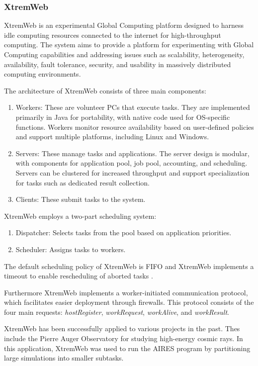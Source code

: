 \subsubsection{XtremWeb}
\label{subsec:background:related_work:xtremweb}
XtremWeb is an experimental Global Computing platform designed to harness idle computing resources connected to the internet for high-throughput computing. The system aims to provide a platform for experimenting with Global Computing capabilities and addressing issues such as scalability, heterogeneity, availability, fault tolerance, security, and usability in massively distributed computing environments. \cite{relatedwork:xtremweb}

The architecture of XtremWeb consists of three main components:
\begin{enumerate}
  \item Workers: These are volunteer PCs that execute tasks. They are implemented primarily in Java for portability, with native code used for OS-specific functions. Workers monitor resource availability based on user-defined policies and support multiple platforms, including Linux and Windows.
  \item Servers: These manage tasks and applications. The server design is modular, with components for application pool, job pool, accounting, and scheduling. Servers can be clustered for increased throughput and support specialization for tasks such as dedicated result collection.
  \item Clients: These submit tasks to the system.
\end{enumerate}
XtremWeb employs a two-part scheduling system:
\begin{enumerate}
  \item Dispatcher: Selects tasks from the pool based on application priorities.
  \item Scheduler: Assigns tasks to workers.
\end{enumerate}
The default scheduling policy of XtremWeb is \ac{FIFO} and XtremWeb implements a timeout to enable rescheduling of aborted tasks \cite{relatedwork:xtremweb}.

Furthermore XtremWeb implements a worker-initiated communication protocol, which facilitates easier deployment through firewalls. This protocol consists of the four main requests: \emph{hostRegister}, \emph{workRequest}, \emph{workAlive}, and \emph{workResult}. \cite{relatedwork:xtremweb}

XtremWeb has been successfully applied to various projects in the past. Thes include the Pierre Auger Observatory for studying high-energy cosmic rays. In this application, XtremWeb was used to run the \ac{AIRES} program by partitioning large simulations into smaller subtasks. \cite{relatedwork:xtremweb}

